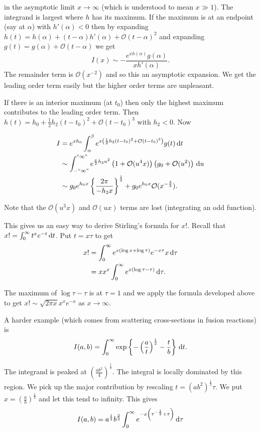 \documentclass{notes}
\newcommand{\cO}{\mathcal{O}}
\theoremstyle{plain}
\begin{document}
in the asymptotic limit $x \to \infty$ (which is understood to mean $x \gg 1$).
The integrand is largest where $h$ has its maximum.  If the maximum is
at an endpoint (say at $\alpha$) with $h'(\alpha) < 0$ then by
expanding $h(t) = h(\alpha) +(t-\alpha)h'(\alpha) + \cO(t-\alpha)^2$
and expanding $g(t) = g(\alpha) + \cO(t-\alpha)$ we get
\[
I(x) \sim - \frac{e^{x h(\alpha)} g(\alpha)}{x h'(\alpha)}.
\]
The remainder term is $\cO(x^{-2})$ and so this an asymptotic expansion.  We
get the leading order term easily but the higher order terms are unpleasant.

If there is an interior maximum (at $t_0$) then only the highest maximum
contributes to the leading order term.  Then
$h(t) = h_0 + \frac{1}{2} h_2 (t-t_0)^2 + \cO(t-t_0)^3$ with
$h_2 < 0$.  Now

\begin{align*}
I &= e^{x h_0} \int_\alpha^\beta e^{x\left(\frac{1}{2} h_2 (t-t_0)^2
+ \cO(t-t_0)^3\right)} g(t)\, \ud t \\
&\sim \int_{- ``\infty\text{''}}^{``\infty\text{''}}
e^{\frac{x}{2} h_2 u^2}\left(1 + \cO(u^4 x)\right)\left(g_0 + \cO(u^2)
\right)\, \ud u \\
&\sim g_0 e^{h_0 x} \left\{\frac{2 \pi}{-h_2 x}\right\}^{\frac{1}{2}}
+ g_0 e^{h_0 x} \cO(x^{-\frac{3}{2}}).
\end{align*}

Note that the $\cO(u^3x)$ and $\cO(ux)$ terms are lost (integrating an
odd function).

This gives us an easy way to derive Stirling's formula for $x!$. Recall
that $x! = \int_0^\infty t^x e^{-t}\, \mathrm{d} t$.  Put $t = x \tau$ to get
\begin{align*}
x! &= \int_0^\infty e^{x \left( \log x + \log \tau \right)} e^{-x \tau} x
\, \mathrm{d} \tau \\
&= x x^x \int_0^\infty e^{x\left( \log \tau - \tau\right)}\, \mathrm{d} \tau.
\end{align*}

The maximum of $\log \tau - \tau$ is at $\tau = 1$ and we apply the formula
developed above to get $x! \sim \sqrt{2 \pi x} x^x e^{-x}$ as $x \to \infty$.

A harder example (which comes from scattering cross-sections in
fusion reactions) is
\[
I(a,b) = \int_0^\infty \exp \left\{ - \left(\frac{a}{t}\right)^{\frac{1}{2}}
 - \frac{t}{b} \right\}\, \mathrm{d} t.
\]

The integrand is peaked at $\left(\frac{a b^2}{4}\right)^{\frac{1}{3}}$.
The integral is locally dominated by this region.  We pick up the
major contribution by rescaling $t = \left( a b^2 \right)^{\frac{1}{3}}\tau$.
We put $x = \left(\frac{a}{b}\right)^{\frac{1}{3}}$ and let this tend to
infinity.  This gives
\[
I(a,b) = a^{\frac{1}{3}} b^{\frac{2}{3}} \int_0^\infty
e^{-x \left(\tau^{-\frac{1}{2}} + \tau \right)}\, \mathrm{d} \tau
\]
\end{document}
